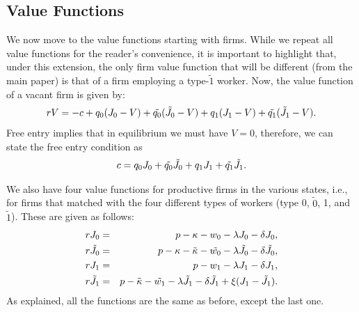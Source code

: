 \documentclass[12pt]{article} %
\theoremstyle{definition}
\begin{document}
\subsection*{Value Functions}\label{regain value functions}
We now move to the value functions starting with  firms. While we repeat all value functions for the reader's convenience, it is important to highlight that, under this extension, the only firm value function that will be different (from the main paper) is that of a firm employing a type-$\tilde{1}$ worker. Now, the value function of a vacant firm is given by:
\begin{equation}
   rV = -c + q_0 (J_0-V) + \Tilde{q_0}(\Tilde{J_0}-V) + q_1 (J_1-V) + \Tilde{q_1}(\Tilde{J_1}-V).\nonumber 
\end{equation}Free entry implies that in equilibrium we must have $V=0$, therefore, we can state the free entry condition as 
\begin{equation}
   c= q_0 J_0 + \Tilde{q_0}\Tilde{J_0} + q_1 J_1 + \Tilde{q_1}\Tilde{J_1}.\label{eq free entry regain} 
\end{equation}

We also have four value functions for productive firms in the various states, i.e., for firms that matched with the four different types of workers (type 0, $\tilde{0}$, 1, and $\tilde{1}$). These are given as follows:   
\begin{eqnarray}
    rJ_0 &=&p-\kappa-w_0-\lambda J_0 - \delta J_0,\nonumber  \\
    r\Tilde{J_0} &=&p-\kappa-\Tilde{\kappa}-\Tilde{w_0}-\lambda \Tilde{J_0} - \delta \Tilde{J_0},\nonumber\\
    rJ_1 &=&p-w_1-\lambda J_1 - \delta J_1, \nonumber \\
        r\Tilde{J_1} &=&p-\Tilde{\kappa}-\Tilde{w_1}-\lambda \Tilde{J_1} - \delta \Tilde{J_1} + \xi(J_1-\tilde{J_1}). \nonumber
    \end{eqnarray}As explained, all the functions are the same as before, except the last one.
\end{document}
